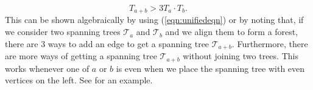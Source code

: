 \documentclass{amsart}
\theoremstyle{definition}
\newcommand{\yandi}[1]{\marginpar{\tiny \color{red} Yandi: #1}}
\newcommand{\saugat}[1]{\marginpar{\tiny \color{blue} Saugat: #1}}
\newcommand{\longnguyen}[1]
{\marginpar{\tiny \color{purple} Long: #1}}
\begin{document}
\begin{equation}\label{eqn:inequalityfirst}
    T_{a + b} > 3T_a \cdot T_b.
\end{equation}
This can be shown algebraically by using (\ref{eqn:unifiedeqn}) or by noting that, if we consider two spanning trees $\mathcal{T}_a$ and $\mathcal{T}_b$ and we align them to form a forest,  there are 3 ways to add an edge to get a spanning tree $\mathcal{T}_{a + b}$. Furthermore, there are more ways of getting a spanning tree $\mathcal{T}_{a + b}$ without joining two trees. This works whenever one of $a$ or $b$ is even when we place the spanning tree with even vertices on the left. See  for an example.

\end{document}
